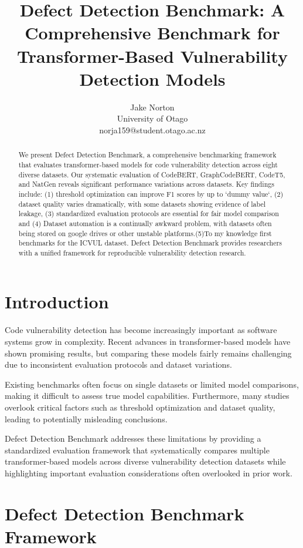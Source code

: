 \documentclass[letterpaper]{article}
\title{Defect Detection Benchmark: A Comprehensive Benchmark for Transformer-Based Vulnerability Detection Models}
\author{
Jake Norton\\
University of Otago\\
norja159@student.otago.ac.nz
}
\begin{document}
\maketitle

\begin{abstract}
	We present Defect Detection Benchmark, a comprehensive benchmarking framework that evaluates transformer-based models for code vulnerability detection across eight diverse datasets. Our systematic evaluation of CodeBERT, GraphCodeBERT, CodeT5, and NatGen reveals significant performance variations across datasets. Key findings include: (1) threshold optimization can improve F1 scores by up to `dummy value`, (2) dataset quality varies dramatically, with some datasets showing evidence of label leakage, (3) standardized evaluation protocols are essential for fair model comparison and (4) Dataset automation is a continually awkward problem, with datasets often being stored on google drives or other unstable platforms.(5)To my knowledge first benchmarks for the ICVUL dataset. Defect Detection Benchmark provides researchers with a unified framework for reproducible vulnerability detection research.
\end{abstract}

\section{Introduction}

Code vulnerability detection has become increasingly important as software systems grow in complexity. Recent advances in transformer-based models have shown promising results, but comparing these models fairly remains challenging due to inconsistent evaluation protocols and dataset variations.

Existing benchmarks often focus on single datasets or limited model comparisons, making it difficult to assess true model capabilities. Furthermore, many studies overlook critical factors such as threshold optimization and dataset quality, leading to potentially misleading conclusions.

Defect Detection Benchmark addresses these limitations by providing a standardized evaluation framework that systematically compares multiple transformer-based models across diverse vulnerability detection datasets while highlighting important evaluation considerations often overlooked in prior work.

\section{Defect Detection Benchmark Framework}
\end{document}
